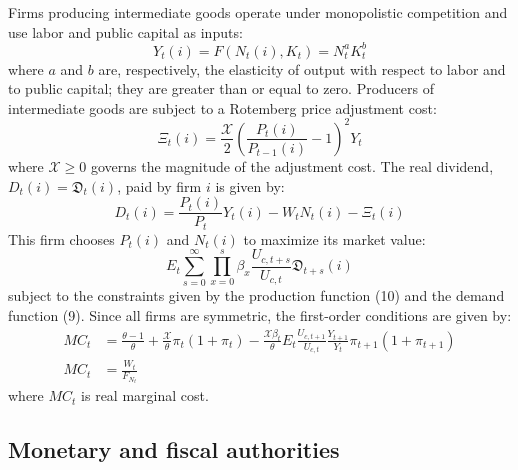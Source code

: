 \documentclass[12pt,letterpaper]{article}
\newcommand{\Et}{E_t}
\newcommand{\XX}{\mathcal{X}}
\newcommand{\DD}{\mathfrak{D}}
\begin{document}
Firms producing intermediate goods operate under monopolistic competition and use labor and public capital as inputs:
\begin{equation}
Y_t(i) = F(N_t(i), K_t) = N_t^a K_t^b \tag{10}
\end{equation}
where $a$ and $b$ are, respectively, the elasticity of output with respect to labor and to public capital; they are greater than or equal to zero. Producers of intermediate goods are subject to a Rotemberg price adjustment cost:
\begin{equation}
\Xi_t(i) = \frac{\XX}{2}\left(\frac{P_t(i)}{P_{t-1}(i)} - 1\right)^2 Y_t \tag{11}
\end{equation}
where $\XX \geq 0$ governs the magnitude of the adjustment cost. The real dividend, $D_t(i) = \DD_t(i)$, paid by firm $i$ is given by:
\begin{equation}
D_t(i) = \frac{P_t(i)}{P_t} Y_t(i) - W_t N_t(i) - \Xi_t(i) \tag{12}
\end{equation}
This firm chooses $P_t(i)$ and $N_t(i)$ to maximize its market value:
\begin{equation}
\Et \sum_{s=0}^{\infty} \prod_{x=0}^{s} \beta_x \frac{U_{c,t+s}}{U_{c,t}} \DD_{t+s}(i) \tag{13}
\end{equation}
subject to the constraints given by the production function (10) and the demand function (9). Since all firms are symmetric, the first-order conditions are given by:
\begin{align}
MC_t &= \frac{\theta-1}{\theta} + \frac{\XX}{\theta}\pi_t(1+\pi_t) - \frac{\XX\beta_t}{\theta}\Et\frac{U_{c,t+1}}{U_{c,t}}\frac{Y_{t+1}}{Y_t}\pi_{t+1}(1+\pi_{t+1}) \tag{14}\\
MC_t &= \frac{W_t}{F_{N_t}} \tag{15}
\end{align}
where $MC_t$ is real marginal cost.

\subsection{Monetary and fiscal authorities}
\end{document}
